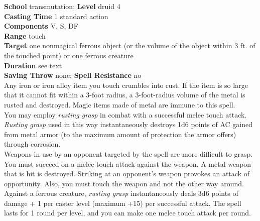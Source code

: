 \textbf{School} transmutation; \textbf{Level} druid 4\\
\textbf{Casting Time} 1 standard action\\
\textbf{Components} V, S, DF\\
\textbf{Range} touch\\
\textbf{Target} one nonmagical ferrous object (or the volume of the object within 3 ft. of the touched point) or one ferrous creature\\
\textbf{Duration} see text\\
\textbf{Saving Throw} none; \textbf{Spell Resistance} no\\
Any iron or iron alloy item you touch crumbles into rust. If the item is so large that it cannot fit within a 3-foot radius, a 3-foot-radius volume of the metal is rusted and destroyed. Magic items made of metal are immune to this spell.\\
You may employ \textit{rusting grasp }in combat with a successful melee touch attack. \textit{Rusting grasp }used in this way instantaneously destroys 1d6 points of AC gained from metal armor (to the maximum amount of protection the armor offers) through corrosion. \\
Weapons in use by an opponent targeted by the spell are more difficult to grasp. You must succeed on a melee touch attack against the weapon. A metal weapon that is hit is destroyed. Striking at an opponent's weapon provokes an attack of opportunity. Also, you must touch the weapon and not the other way around.\\
Against a ferrous creature, \textit{rusting grasp }instantaneously deals 3d6 points of damage + 1 per caster level (maximum +15) per successful attack. The spell lasts for 1 round per level, and you can make one melee touch attack per round.\\
